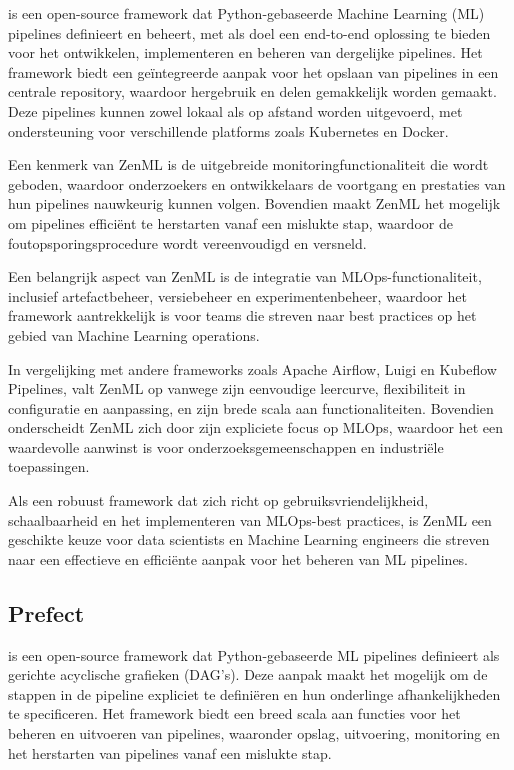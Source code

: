 \textcite{ZenML2024} is een open-source framework dat Python-gebaseerde Machine Learning (ML) pipelines definieert en beheert, met als doel een end-to-end oplossing te bieden voor het ontwikkelen, implementeren en beheren van dergelijke pipelines. Het framework biedt een geïntegreerde aanpak voor het opslaan van pipelines in een centrale repository, waardoor hergebruik en delen gemakkelijk worden gemaakt. Deze pipelines kunnen zowel lokaal als op afstand worden uitgevoerd, met ondersteuning voor verschillende platforms zoals Kubernetes en Docker.

Een kenmerk van ZenML is de uitgebreide monitoringfunctionaliteit die wordt geboden, waardoor onderzoekers en ontwikkelaars de voortgang en prestaties van hun pipelines nauwkeurig kunnen volgen. Bovendien maakt ZenML het mogelijk om pipelines efficiënt te herstarten vanaf een mislukte stap, waardoor de foutopsporingsprocedure wordt vereenvoudigd en versneld.

Een belangrijk aspect van ZenML is de integratie van MLOps-functionaliteit, inclusief artefactbeheer, versiebeheer en experimentenbeheer, waardoor het framework aantrekkelijk is voor teams die streven naar best practices op het gebied van Machine Learning operations.

In vergelijking met andere frameworks zoals Apache Airflow, Luigi en Kubeflow Pipelines, valt ZenML op vanwege zijn eenvoudige leercurve, flexibiliteit in configuratie en aanpassing, en zijn brede scala aan functionaliteiten. Bovendien onderscheidt ZenML zich door zijn expliciete focus op MLOps, waardoor het een waardevolle aanwinst is voor onderzoeksgemeenschappen en industriële toepassingen.

Als een robuust framework dat zich richt op gebruiksvriendelijkheid, schaalbaarheid en het implementeren van MLOps-best practices, is ZenML een geschikte keuze voor data scientists en Machine Learning engineers die streven naar een effectieve en efficiënte aanpak voor het beheren van ML pipelines.


\subsection{Prefect}

\textcite{Prefect2024} is een open-source framework dat Python-gebaseerde ML pipelines definieert als gerichte acyclische grafieken (DAG's). Deze aanpak maakt het mogelijk om de stappen in de pipeline expliciet te definiëren en hun onderlinge afhankelijkheden te specificeren. Het framework biedt een breed scala aan functies voor het beheren en uitvoeren van pipelines, waaronder opslag, uitvoering, monitoring en het herstarten van pipelines vanaf een mislukte stap.

